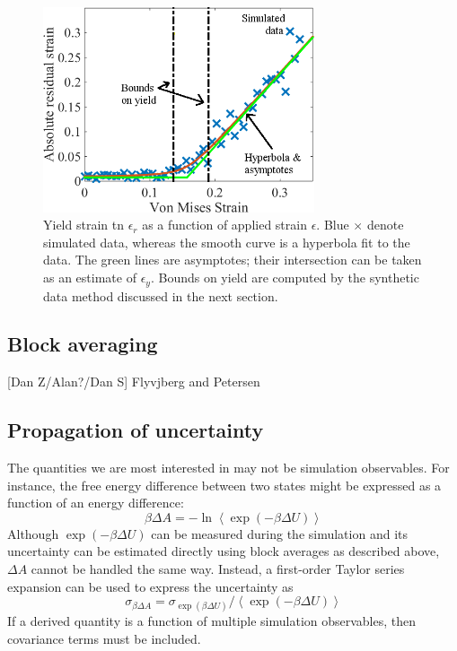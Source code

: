 \begin{figure}
\includegraphics[width=8cm]{hyperbola.png}\caption{Yield strain tn $\epsilon_r$ as a function of applied strain $\epsilon$.  Blue $\times$ denote simulated data, whereas the smooth curve is a hyperbola fit to the data.  The green lines are asymptotes; their intersection can be taken as an estimate of $\epsilon_y$.    Bounds on yield are computed by the synthetic data method discussed in the next section.}\label{fig:yield}
\end{figure}

\subsection{Block averaging}
[Dan Z/Alan?/Dan S] Flyvjberg and Petersen 

\subsection{Propagation of uncertainty}

The quantities we are most interested in may not be simulation observables.  For instance, the free energy difference between two states might be expressed as a function of an energy difference:
\begin{equation}
\beta \Delta A = -\ln \left< \exp \left(-\beta \Delta U\right) \right>
\end{equation}
Although $\exp(-\beta \Delta U)$ can be measured during the simulation and its uncertainty can be estimated directly using block averages as described above, $\Delta A$ cannot be handled the same way.  Instead, a first-order Taylor series expansion can be used to express the uncertainty as
\begin{equation}
  \sigma_{\beta \Delta A} = \sigma_{\exp(\beta \Delta U)} / \left< \exp \left(-\beta \Delta U\right) \right>
  \label{eq:propagation_bDA}
\end{equation}
If a derived quantity is a function of multiple simulation observables, then covariance terms must be included.

